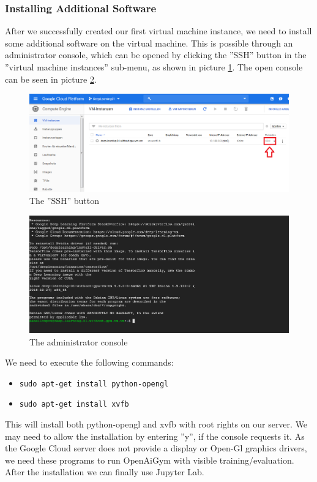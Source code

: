 \documentclass[a4paper]{article}
\begin{document}
\subsubsection{Installing Additional Software}
After we successfully created our first virtual machine instance, we need to install some additional software on the virtual machine. This is possible through an administrator console, which can be opened by clicking the ''SSH'' button in the ''virtual machine instances'' sub-menu, as shown in picture \ref{fig_adminConsole}. The open console can be seen in picture \ref{fig_adminConsole2}.\\
\begin{figure}[H]
	\centerline{\includegraphics[width=\textwidth]{img/adminConsole}}
	\caption{The ''SSH'' button}
	\label{fig_adminConsole}
\end{figure}
\begin{figure}[H]
	\centerline{\includegraphics[width=\textwidth]{img/adminConsole2}}
	\caption{The administrator console}
	\label{fig_adminConsole2}
\end{figure}
We need to execute the following commands:
\begin{itemize}
	\item \lstinline|sudo apt-get install python-opengl|
	\item \lstinline|sudo apt-get install xvfb|
\end{itemize}
This will install both python-opengl and xvfb with root rights on our server. We may need to allow the installation by entering ''y'', if the console requests it.  As the Google Cloud server does not provide a display or Open-Gl graphics drivers, we need these programs to run OpenAiGym with visible training/evaluation.\\
After the installation we can finally use Jupyter Lab.
\end{document}
